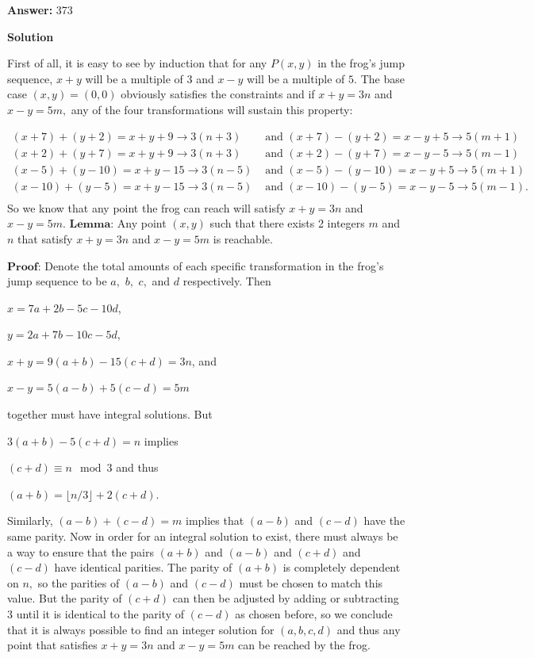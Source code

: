 \begin{enumerate}
 \textbf{Answer: }373



\textbf{Solution}

First of all, it is easy to see by induction that for any $P(x,y)$ in the frog's jump sequence, $x+y$ will be a multiple of $3$ and $x-y$ will be a multiple of $5.$ The base case $(x,y) = (0,0)$ obviously satisfies the constraints and if $x+y = 3n$ and $x-y = 5m,$ any of the four transformations will sustain this property:

 
 \begin{align*} (x+7)+(y+2) = x+y+9 \rightarrow 3(n+3) &\text{ and } (x+7)-(y+2) = x-y+5 \rightarrow 5(m+1)\\ (x+2)+(y+7) = x+y+9 \rightarrow 3(n+3) &\text{ and } (x+2)-(y+7) = x-y-5 \rightarrow 5(m-1)\\ (x-5)+(y-10) = x+y-15 \rightarrow 3(n-5) &\text{ and } (x-5)-(y-10) = x-y+5 \rightarrow 5(m+1)\\ (x-10)+(y-5) = x+y-15 \rightarrow 3(n-5) &\text{ and } (x-10)-(y-5) = x-y-5 \rightarrow 5(m-1).\\ \end{align*}
So we know that any point the frog can reach will satisfy $x+y = 3n$ and $x-y = 5m.$
$\textbf{Lemma:}$ Any point $(x,y)$ such that there exists 2 integers $m$ and $n$ that satisfy $x+y = 3n$ and $x-y = 5m$ is reachable. 

 
$\textbf{Proof:}$ Denote the total amounts of each specific transformation in the frog's jump sequence to be $a,$ $b,$ $c,$ and $d$ respectively. Then

 $x=7a+2b-5c-10d$,

 $y=2a+7b-10c-5d$,

 $x+y = 9(a+b)-15(c+d) = 3n$, and

 $x-y = 5(a-b)+5(c-d) = 5m$

 together must have integral solutions. But

 $3(a+b)-5(c+d) = n$ implies

 $(c+d) \equiv n \mod 3$ and thus

 $(a+b) = \lfloor{n/3}\rfloor + 2(c+d).$

 Similarly, $(a-b)+(c-d) = m$ implies that $(a-b)$ and $(c-d)$ have the same parity. Now in order for an integral solution to exist, there must always be a way to ensure that the pairs $(a+b)$ and $(a-b)$ and $(c+d)$ and $(c-d)$ have identical parities. The parity of $(a+b)$ is completely dependent on $n,$ so the parities of $(a-b)$ and $(c-d)$ must be chosen to match this value. But the parity of $(c+d)$ can then be adjusted by adding or subtracting $3$ until it is identical to the parity of $(c-d)$ as chosen before, so we conclude that it is always possible to find an integer solution for $(a,b,c,d)$ and thus any point that satisfies $x+y = 3n$ and $x-y = 5m$ can be reached by the frog.


\end{enumerate}
